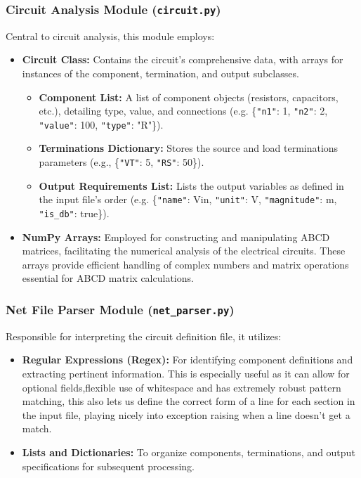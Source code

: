 \documentclass[conference]{IEEEtran}
\begin{document}
\subsubsection*{Circuit Analysis Module (\texttt{circuit.py})}
Central to circuit analysis, this module employs:
\begin{itemize}
    \item \textbf{Circuit Class:} Contains the circuit's comprehensive data, with arrays for instances of the component, termination, and output subclasses.
    \begin{itemize}
        \item \textbf{Component List:} A list of component objects (resistors, capacitors, etc.), detailing type, value, and connections (e.g. \{\texttt{"n1"}: 1, \texttt{"n2"}: 2, \texttt{"value"}: 100, \texttt{"type"}: "R"\}).
        \item \textbf{Terminations Dictionary:} Stores the source and load terminations parameters (e.g., \{\texttt{"VT"}: 5, \texttt{"RS"}: 50\}).
        \item \textbf{Output Requirements List:} Lists the output variables as defined in the input file's order (e.g. \{\texttt{"name"}: Vin, \texttt{"unit"}: V, \texttt{"magnitude"}: m, \texttt{"is\_db"}: true\}).
    \end{itemize}
    \item \textbf{NumPy Arrays:} Employed for constructing and manipulating ABCD matrices, facilitating the numerical analysis of the electrical circuits. These arrays provide efficient handling of complex numbers and matrix operations essential for ABCD matrix calculations.
\end{itemize}

\subsubsection*{Net File Parser Module (\texttt{net\_parser.py})}
Responsible for interpreting the circuit definition file, it utilizes:
\begin{itemize}
    \item \textbf{Regular Expressions (Regex):} For identifying component definitions and extracting pertinent information. 
    This is especially useful as it can allow for optional fields,flexible use of whitespace and has extremely robust pattern matching,
    this also lets us define the correct form of a line for each section in the input file, playing nicely into exception raising when a line doesn't get a match.
    \item \textbf{Lists and Dictionaries:} To organize components, terminations, and output specifications for subsequent processing.
\end{itemize}
\end{document}
